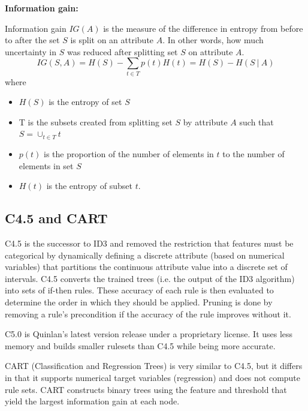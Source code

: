 \documentclass[a4paper, 11pt]{article}
\begin{document}
\textbf{Information gain:}

Information gain $IG(A)$ is the measure of the difference in entropy from before to after the set $S$ is split on an attribute $A$. In other words, how much uncertainty in $S$ was reduced after splitting set $S$ on attribute $A$.
$$IG(S,A)=H(S)-\sum_{t\in T}p(t)H(t)=H(S)-H(S\ |\ A)$$
where
\begin{itemize}
	\item $H(S)$ is the entropy of set $S$
	\item T is the subsets created from splitting set $S$ by attribute $A$ such that $S=\cup_{t\in T}t$
	\item $p(t)$ is the proportion of the number of elements in $t$ to the number of elements in set $S$
	\item $H(t)$ is the entropy of subset $t$.
\end{itemize}
\subsection{C4.5 and CART}
C4.5 is the successor to ID3 and removed the restriction that features must be categorical by dynamically defining a discrete attribute (based on numerical variables) that partitions the continuous attribute value into a discrete set of intervals. C4.5 converts the trained trees (i.e. the output of the ID3 algorithm) into sets of if-then rules. These accuracy of each rule is then evaluated to determine the order in which they should be applied. Pruning is done by removing a rule’s precondition if the accuracy of the rule improves without it.

C5.0 is Quinlan’s latest version release under a proprietary license. It uses less memory and builds smaller rulesets than C4.5 while being more accurate.

CART (Classification and Regression Trees) is very similar to C4.5, but it differs in that it supports numerical target variables (regression) and does not compute rule sets. CART constructs binary trees using the feature and threshold that yield the largest information gain at each node.
\end{document}
